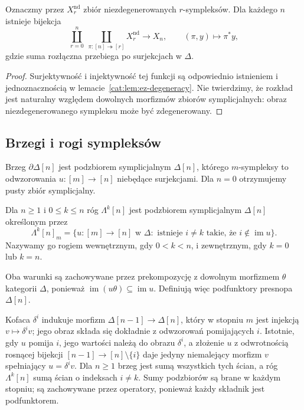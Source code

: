 \begin{wniosek}\label{cat:cor:ez-degeneracy-decomposition}
Oznaczmy przez $X_r^{\mathrm{nd}}$ zbiór niezdegenerowanych $r$-sympleksów. Dla każdego $n$ istnieje bijekcja
\[
 \coprod_{r=0}^n\ \coprod_{\pi:[n]\twoheadrightarrow[r]}
 X_r^{\mathrm{nd}}\longrightarrow X_n,\qquad
 (\pi,y)\longmapsto\pi^*y,
\]
gdzie suma rozłączna przebiega po surjekcjach w $\Delta$.
\end{wniosek}
\begin{proof}
Surjektywność i injektywność tej funkcji są odpowiednio istnieniem i jednoznacznością w lemacie~\ref{cat:lem:ez-degeneracy}. Nie twierdzimy, że rozkład jest naturalny względem dowolnych morfizmów zbiorów symplicjalnych: obraz niezdegenerowanego sympleksu może być zdegenerowany.
\end{proof}

\subsection{Brzegi i rogi sympleksów}

\begin{definicja}\label{cat:def:simplicial-boundary-horn}
Brzeg $\partial\Delta[n]$ jest podzbiorem symplicjalnym $\Delta[n]$, którego $m$-sympleksy to odwzorowania $u:[m]\to[n]$ niebędące surjekcjami. Dla $n=0$ otrzymujemy pusty zbiór symplicjalny.

Dla $n\geq1$ i $0\leq k\leq n$ róg $\Lambda^k[n]$ jest podzbiorem symplicjalnym $\Delta[n]$ określonym przez
\[
 \Lambda^k[n]_m=
 \{u:[m]\to[n]\text{ w }\Delta:
       \text{ istnieje }i\ne k\text{ takie, że }i\notin\operatorname{im}u\}.
\]
Nazywamy go rogiem wewnętrznym, gdy $0<k<n$, i zewnętrznym, gdy $k=0$ lub $k=n$.
\end{definicja}
Oba warunki są zachowywane przez prekompozycję z dowolnym morfizmem $\theta$ kategorii $\Delta$, ponieważ $\operatorname{im}(u\theta)\subseteq\operatorname{im}u$. Definiują więc podfunktory presnopa $\Delta[n]$.

Kofaca $\delta^i$ indukuje morfizm $\Delta[n-1]\to\Delta[n]$, który w stopniu $m$ jest injekcją $v\mapsto\delta^iv$; jego obraz składa się dokładnie z odwzorowań pomijających $i$. Istotnie, gdy $u$ pomija $i$, jego wartości należą do obrazu $\delta^i$, a złożenie $u$ z odwrotnością rosnącej bijekcji $[n-1]\to[n]\setminus\{i\}$ daje jedyny niemalejący morfizm $v$ spełniający $u=\delta^iv$. Dla $n\geq1$ brzeg jest sumą wszystkich tych ścian, a róg $\Lambda^k[n]$ sumą ścian o indeksach $i\ne k$. Sumy podzbiorów są brane w każdym stopniu; są zachowywane przez operatory, ponieważ każdy składnik jest podfunktorem.

